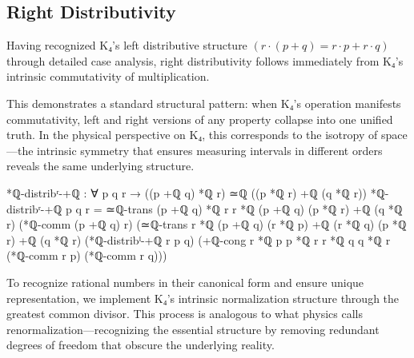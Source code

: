\documentclass[11pt,a4paper]{book}
\begin{document}
\subsection{Right Distributivity}

Having recognized K₄'s left distributive structure $(r \cdot (p + q) = r \cdot p + r \cdot q)$ through detailed case analysis, right distributivity follows immediately from K₄'s intrinsic commutativity of multiplication.

This demonstrates a standard structural pattern: when K₄'s operation manifests commutativity, left and right versions of any property collapse into one unified truth. In the physical perspective on K₄, this corresponds to the isotropy of space—the intrinsic symmetry that ensures measuring intervals in different orders reveals the same underlying structure.

\begin{code}
*ℚ-distribʳ-+ℚ : ∀ p q r → ((p +ℚ q) *ℚ r) ≃ℚ ((p *ℚ r) +ℚ (q *ℚ r))
*ℚ-distribʳ-+ℚ p q r = 
  ≃ℚ-trans {(p +ℚ q) *ℚ r} {r *ℚ (p +ℚ q)} {(p *ℚ r) +ℚ (q *ℚ r)}
    (*ℚ-comm (p +ℚ q) r)
    (≃ℚ-trans {r *ℚ (p +ℚ q)} {(r *ℚ p) +ℚ (r *ℚ q)} {(p *ℚ r) +ℚ (q *ℚ r)}
      (*ℚ-distribˡ-+ℚ r p q)
      (+ℚ-cong {r *ℚ p} {p *ℚ r} {r *ℚ q} {q *ℚ r} 
               (*ℚ-comm r p) (*ℚ-comm r q)))
\end{code}

To recognize rational numbers in their canonical form and ensure unique representation, we implement K₄'s intrinsic normalization structure through the greatest common divisor. This process is analogous to what physics calls renormalization—recognizing the essential structure by removing redundant degrees of freedom that obscure the underlying reality.
\end{document}
